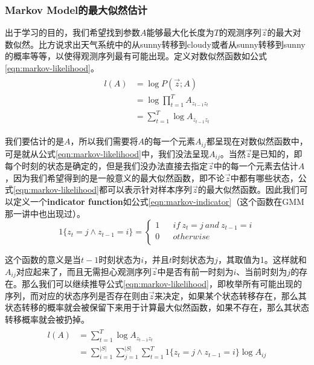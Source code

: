 \subsubsection{Markov Model的最大似然估计}
出于学习的目的，我们希望找到参数$A$能够最大化长度为$T$的观测序列$\vec{z}$的最大对数似然。比方说求出天气系统中的从sunny转移到cloudy或者从sunny转移到sunny的概率等等，以使得观测序列最有可能出现。定义对数似然函数如公式\ref{eqn:markov-likelihood}。
\begin{align}
\label{eqn:markov-likelihood}
\begin{split}
  l(A) &= \log P(\vec{z};A) \\
       &= \log \prod_{t=1}^{T} A_{z_{t-1}z_t} \\
       &= \sum_{t=1}^{T} \log A_{z_{t-1}z_t} 
\end{split}
\end{align}

我们要估计的是$A$，所以我们需要将$A$的每一个元素$A_{ij}$都呈现在对数似然函数中，可是就从公式\ref{eqn:markov-likelihood}中，我们没法呈现$A_{ij}$。当然$\vec{z}$是已知的，即每个时刻的状态是确定的，但是我们没办法直接去指定$\vec{z}$中的每一个元素去估计$A$，因为我们希望得到的是一般意义的最大似然函数，即不论$\vec{z}$中都有哪些状态，公式\ref{eqn:markov-likelihood}都可以表示针对样本序列$\vec{z}$的最大似然函数。因此我们可以定义一个{\bf indicator function}如公式\ref{eqn:markov-indicator}（这个函数在GMM那一讲中也出现过）。
\begin{equation}
\label{eqn:markov-indicator}
1\{z_t=j \wedge z_{t-1}=i\}=\left\{
\begin{array}{rcl}
1& & if \  z_t=j \  and \  z_{t-1}=i\\
0 & & otherwise\\
\end{array} \right.
\end{equation}

这个函数的意义是当$t-1$时刻状态为$i$，并且$t$时刻状态为$j$，其取值为1。这样就和$A_{ij}$对应起来了，而且无需担心观测序列$\vec{z}$中是否有前一时刻为$i$、当前时刻为$j$的存在。那么我们可以继续推导公式\ref{eqn:markov-likelihood}，即枚举所有可能出现的序列，而对应的状态序列是否存在则由$\vec{z}$来决定，如果某个状态转移存在，那么其状态转移的概率就会被保留下来用于计算最大似然函数，如果不存在，那么其状态转移概率就会被扔掉。
\begin{align}
\label{eqn:markov-likelihood1}
\begin{split}
  l(A) &= \sum_{t=1}^{T} \log A_{z_{t-1}z_t} \\
       &= \sum_{i=1}^{|S|} \sum_{j=1}^{|S|} \sum_{t=1}^{T} 1\{z_t=j \wedge z_{t-1}=i\} \log A_{ij}
\end{split}
\end{align}


